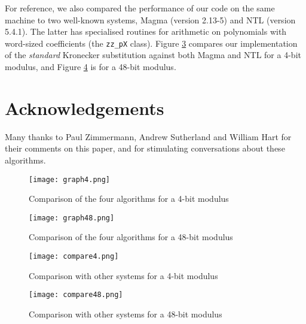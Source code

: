 \documentclass{amsart}
\theoremstyle{definition}
\theoremstyle{remark}
\begin{document}
For reference, we also compared the performance of our code on the same machine to two well-known systems, Magma (version 2.13-5) and NTL (version 5.4.1). The latter has specialised routines for arithmetic on polynomials with word-sized coefficients (the \texttt{zz\_pX} class). Figure \ref{fig:4-bit-compare} compares our implementation of the \emph{standard} Kronecker substitution against both Magma and NTL for a 4-bit modulus, and Figure \ref{fig:48-bit-compare} is for a 48-bit modulus.


\section*{Acknowledgements}

Many thanks to Paul Zimmermann, Andrew Sutherland and William Hart for their comments on this paper, and for stimulating conversations about these algorithms.





\newpage

\begin{figure}
\begin{center}
\texttt{[image: graph4.png]}
\caption{Comparison of the four algorithms for a 4-bit modulus}
\label{fig:4-bit}
\end{center}
\end{figure}


\begin{figure}
\begin{center}
\texttt{[image: graph48.png]}
\caption{Comparison of the four algorithms for a 48-bit modulus}
\label{fig:48-bit}
\end{center}
\end{figure}


\begin{figure}
\begin{center}
\texttt{[image: compare4.png]}
\caption{Comparison with other systems for a 4-bit modulus}
\label{fig:4-bit-compare}
\end{center}
\end{figure}


\begin{figure}
\begin{center}
\texttt{[image: compare48.png]}
\caption{Comparison with other systems for a 48-bit modulus}
\label{fig:48-bit-compare}
\end{center}
\end{figure}
\end{document}
